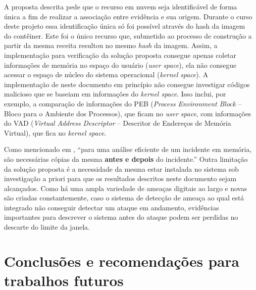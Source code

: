 A proposta descrita pede que o recurso em nuvem seja identificável de forma única a fim de realizar a associação entre evidência e sua origem.
%
Durante o curso deste projeto essa identificação única só foi possível através do hash da imagem do contêiner. Este foi o único recurso que, submetido ao processo de construção a partir da mesma receita resultou no mesmo \textit{hash} da imagem.
%
Assim, a implementação para verificação da solução proposta consegue apenas coletar informações de memória no espaço do usuário (\textit{user space}), ela não consegue acessar o espaço de núcleo do sistema operacional (\textit{kernel space}). 
%
A implementação de \fancyname neste documento em princípio não consegue investigar códigos malicioso que se baseiam em informações do \textit{kernel space}.
%
Isso inclui, por exemplo, a comparação de informações do PEB (\textit{Process Environment Block} -- Bloco para o Ambiente dos Processos), que ficam no \textit{user space}, com informações do VAD (\textit{Virtual Address Descriptor} -- Descritor de Endereços de Memória Virtual), que fica no \textit{kernel space}. 
%

Como mencionado em \cite{CaseMemoryForensics:2014}, ``para uma análise eficiente de um incidente em memória, são necessárias cópias da mesma \textbf{antes e depois} do incidente.''
%
Outra limitação da solução proposta é a necessidade da mesma estar instalada no sistema sob investigação a priori para que os resultados descritos neste documento sejam alcançados.
%
Como há uma ampla variedade de ameaças digitais ao largo e novas são criadas constantemente, caso o sistema de detecção de ameaça ao qual \fancyname está integrado não conseguir detectar um ataque em andamento, evidências importantes para descrever o sistema antes do ataque podem ser perdidas no descarte do limite da janela.


\chapter{Conclusões e recomendações para trabalhos futuros}
\label{sec:proposta-concl-recom}

